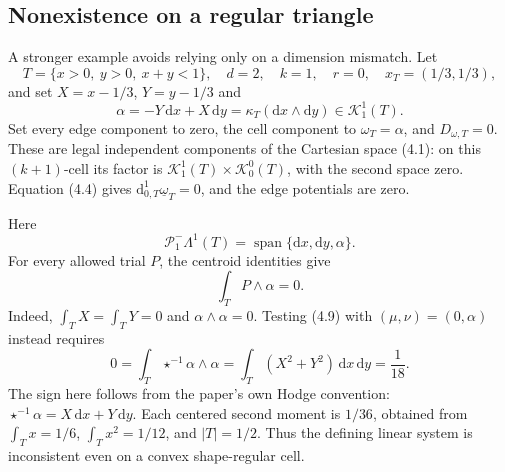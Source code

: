 \documentclass[10pt]{article}
\begin{document}
\subsection*{Nonexistence on a regular triangle}
A stronger example avoids relying only on a dimension mismatch. Let \[T=\{x>0,\ y>0,\ x+y<1\},\quad
 d=2,\quad k=1,\quad r=0,\quad x_T=(1/3,1/3),\] and set \(X=x-1/3\), \(Y=y-1/3\) and \[\alpha=-Y\,\mathrm dx+X\,\mathrm dy=\kappa_T(\mathrm dx\wedge\mathrm dy)
 \in\mathcal K^1_1(T).\] Set every edge component to zero, the cell component to \(\omega_T=\alpha\), and \(D_{\omega,T}=0\). These are legal independent components of the Cartesian space (4.1): on this \((k+1)\)-cell its factor is \(\mathcal K^1_1(T)\times\mathcal K^0_0(T)\), with the second space zero. Equation (4.4) gives \(\mathrm d_{0,T}^1\underline\omega_T=0\), and the edge potentials are zero.\par
Here \[\mathcal P^-_1\Lambda^1(T)=\operatorname{span}\{\mathrm dx,\mathrm dy,\alpha\}.\] For every allowed trial \(P\), the centroid identities give \[\int_T P\wedge\alpha=0.\] Indeed, \(\int_T X=\int_T Y=0\) and \(\alpha\wedge\alpha=0\). Testing (4.9) with \((\mu,\nu)=(0,\alpha)\) instead requires \[0=\int_T\star^{-1}\alpha\wedge\alpha
   =\int_T(X^2+Y^2)\,\mathrm dx\,\mathrm dy
   =\frac1{18}.                                         \tag{2}\] The sign here follows from the paper’s own Hodge convention: \(\star^{-1}\alpha=X\,\mathrm dx+Y\,\mathrm dy\). Each centered second moment is \(1/36\), obtained from \(\int_Tx=1/6\), \(\int_Tx^2=1/12\), and \(|T|=1/2\). Thus the defining linear system is inconsistent even on a convex shape-regular cell.\par
\end{document}
